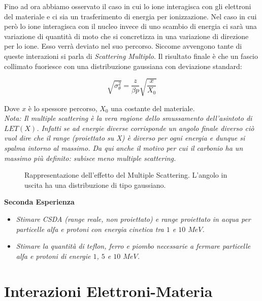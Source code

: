 Fino ad ora abbiamo osservato il caso in cui lo ione interagisca con gli elettroni del materiale e ci sia un trasferimento di energia per ionizzazione.
Nel caso in cui però lo ione interagisca con il nucleo invece di uno scambio di energia ci sarà una variazione di quantità di moto che si concretizza in una variazione di direzione per lo ione. Esso verrà deviato nel suo percorso. Siccome avvengono tante di queste interazioni si parla di \emph{Scattering Multiplo}. 
Il risultato finale è che un fascio collimato fuoriesce con una distribuzione gaussiana con deviazione standard:

\begin{equation}
\sqrt{\sigma_{\theta}^2}=\frac{z}{\beta p}\sqrt{\frac{x}{X_0}}
\end{equation}

Dove $x$ è lo spessore percorso, $X_0$ una costante del materiale.\\

\emph{Nota: Il multiple scattering è la vera ragione dello smussamento dell'asintoto di $LET(X)$. Infatti se ad energie diverse corrisponde un angolo finale diverso ciò vuol dire che il range (proiettato su X) è diverso per ogni energia e dunque si spalma intorno al massimo. Da qui anche il motivo per cui il carbonio ha un massimo più definito: subisce meno multiple scattering.}\\

\begin{figure}
\centering
	\caption{Rappresentazione dell'effetto del Multiple Scattering. L'angolo in uscita ha una distribuzione di tipo gaussiano.}
	\label{multiplescattering}
\end{figure}

\textbf{Seconda Esperienza}\\

\begin{itemize}
\item \emph{Stimare CSDA (range reale, non proiettato) e range proiettato in acqua per particelle alfa e protoni con energia cinetica tra $1$ e $10$ $MeV$.}
\item \emph{Stimare la quantità di teflon, ferro e piombo necessarie a fermare particelle alfa e protoni di energie $1$, $5$ e $10$ $MeV$.}
\end{itemize}

\section{Interazioni Elettroni-Materia}

